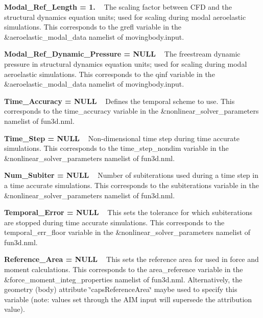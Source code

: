 \begin{DoxyItemize}
\item {\bfseries{Modal\+\_\+\+Ref\+\_\+\+Length = 1. }} ~\newline
 The scaling factor between CFD and the structural dynamics equation units; used for scaling during modal aeroelastic simulations. This corresponds to the grefl variable in the \&aeroelastic\+\_\+modal\+\_\+data namelist of movingbody.\+input.
\item {\bfseries{Modal\+\_\+\+Ref\+\_\+\+Dynamic\+\_\+\+Pressure = NULL }} ~\newline
 The freestream dynamic pressure in structural dynamics equation units; used for scaling during modal aeroelastic simulations. This corresponds to the qinf variable in the \&aeroelastic\+\_\+modal\+\_\+data namelist of movingbody.\+input.
\item {\bfseries{Time\+\_\+\+Accuracy = NULL }} ~\newline
 Defines the temporal scheme to use. This corresponds to the time\+\_\+accuracy variable in the \&nonlinear\+\_\+solver\+\_\+parameters namelist of fun3d.\+nml.
\item {\bfseries{Time\+\_\+\+Step = NULL }} ~\newline
 Non-\/dimensional time step during time accurate simulations. This corresponds to the time\+\_\+step\+\_\+nondim variable in the \&nonlinear\+\_\+solver\+\_\+parameters namelist of fun3d.\+nml.
\item {\bfseries{Num\+\_\+\+Subiter = NULL }} ~\newline
 Number of subiterations used during a time step in a time accurate simulations. This corresponds to the subiterations variable in the \&nonlinear\+\_\+solver\+\_\+parameters namelist of fun3d.\+nml.
\item {\bfseries{Temporal\+\_\+\+Error = NULL }} ~\newline
 This sets the tolerance for which subiterations are stopped during time accurate simulations. This corresponds to the temporal\+\_\+err\+\_\+floor variable in the \&nonlinear\+\_\+solver\+\_\+parameters namelist of fun3d.\+nml.
\item {\bfseries{Reference\+\_\+\+Area = NULL }} ~\newline
 This sets the reference area for used in force and moment calculations. This corresponds to the area\+\_\+reference variable in the \&force\+\_\+moment\+\_\+integ\+\_\+properties namelist of fun3d.\+nml. Alternatively, the geometry (body) attribute \char`\"{}caps\+Reference\+Area\char`\"{} maybe used to specify this variable (note\+: values set through the AIM input will supersede the attribution value).

\end{DoxyItemize}
